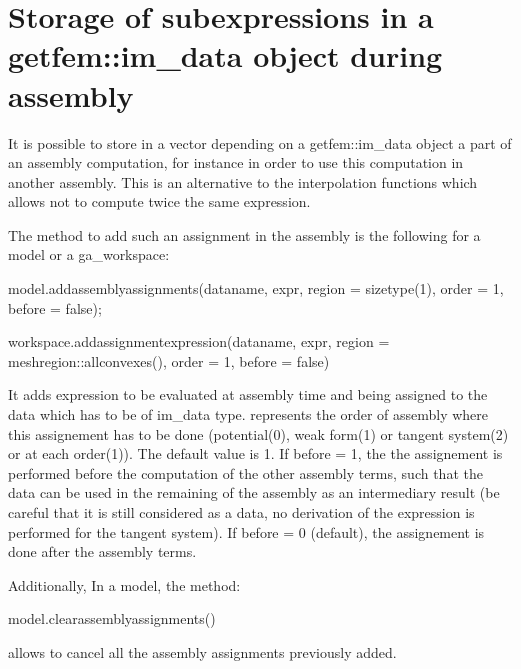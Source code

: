 \documentclass[a4paper,11pt,english]{sphinxmanual}
\begin{document}
\section{Storage of sub\sphinxhyphen{}expressions in a getfem::im\_data object during assembly}
\label{\detokenize{userdoc/gasm_high:storage-of-sub-expressions-in-a-getfem-im-data-object-during-assembly}}
It is possible to store in a vector depending on a getfem::im\_data object a part of an assembly computation, for instance in order to use this computation in another assembly. This is an alternative to the interpolation functions which allows not to compute twice the same expression.

The method to add such an assignment in the assembly is the following for a model or a ga\_workspace:

\begin{sphinxVerbatim}[commandchars=\\\{\}]
model.add\PYGZus{}assembly\PYGZus{}assignments(dataname, expr, region = size\PYGZus{}type(\PYGZhy{}1),
                               order = 1, before = false);

workspace.add\PYGZus{}assignment\PYGZus{}expression(dataname, expr,
          region = mesh\PYGZus{}region::all\PYGZus{}convexes(), order = 1, before = false)
\end{sphinxVerbatim}

It adds expression  to be evaluated at assembly time and being
assigned to the data  which has to be of im\_data type.
 represents the order of assembly where this assignement has to be
done (potential(0), weak form(1) or tangent system(2) or at each
order(\sphinxhyphen{}1)). The default value is 1.
If before = 1, the the assignement is performed before the computation
of the other assembly terms, such that the data can be used in the
remaining of the assembly as an intermediary result (be careful that it is
still considered as a data, no derivation of the expression is performed for
the tangent system).
If before = 0 (default), the assignement is done after the assembly terms.

Additionally, In a model, the method:

\begin{sphinxVerbatim}[commandchars=\\\{\}]
model.clear\PYGZus{}assembly\PYGZus{}assignments()
\end{sphinxVerbatim}

allows to cancel all the assembly assignments previously added.
\end{document}
